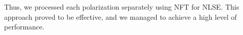 Thus, we processed each polarization separately using NFT for NLSE. This approach proved to be effective, and we managed to achieve a high level of performance.


\begin{figure}[tpb]
    \begin{minipage}[h]{0.5\linewidth}
    \end{minipage}
    \hfill
    \begin{minipage}[h]{0.5\linewidth}
\end{minipage}
\end{figure}
